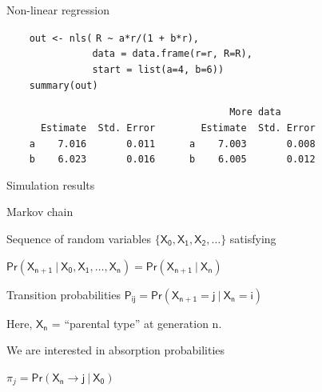 \documentclass[aspectratio=169,12pt,t]{beamer}
\begin{document}
\begin{frame}[fragile]{Non-linear regression}
\addtocounter{framenumber}{-1}

\vspace{5mm}

\verb|    out <- nls(| {\tt \vhilit R \verb|~| a*r/(1 + b*r)}\verb|,| \\
\verb|               data = data.frame(r=r, R=R),| \\
\verb|               start = list(a=4, b=6))| \\
\verb|    summary(out)|

\vspace{8mm}

{\hilit
\verb|                                       More data      | \\
\verb|      Estimate  Std. Error        Estimate  Std. Error| \\
\verb|    a    7.016       0.011      a    7.003       0.008| \\
\verb|    b    6.023       0.016      b    6.005       0.012|
}


\note{
}

\end{frame}


\begin{frame}[c]{Simulation results}

\note{
}


\note{
}

\end{frame}


\begin{frame}[c]{Markov chain}

\bbi
\item Sequence of random variables $\mathsf{\{X_0, X_1, X_2, \dots\}}$
  satisfying

\vspace{2mm}

\centerline{\hilit $\mathsf{Pr(X_{n+1} \ | \ X_0,
X_1, \dots, X_n) = Pr(X_{n+1} \ | \ X_n)}$}

\item Transition probabilities {\hilit $\mathsf{P_{ij} =
  Pr(X_{n+1} = j \ | \ X_n = i)}$}

\item Here, $\mathsf{X_n}$ = ``parental type'' at generation n.

\item We are interested in {\vhilit absorption probabilities}

\vspace{2mm}

\centerline{\hilit $\pi_j = \mathsf{Pr(X_n \rightarrow j \ | \ X_0)}$}
\ei


\note{
}

\end{frame}
\end{document}
